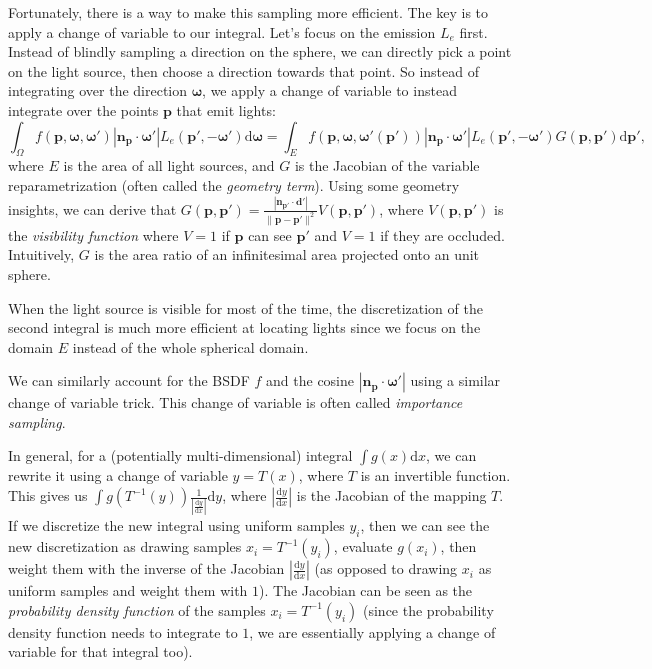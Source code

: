 \documentclass{article}
\begin{document}
Fortunately, there is a way to make this sampling more efficient. The key is to apply a change of variable to our integral. Let's focus on the emission $L_e$ first. Instead of blindly sampling a direction on the sphere, we can directly pick a point on the light source, then choose a direction towards that point. So instead of integrating over the direction $\mathbf{\omega}$, we apply a change of variable to instead integrate over the points $\mathbf{p}$ that emit lights:
\begin{equation}
    \int_{\Omega} f(\mathbf{p}, \mathbf{\omega}, \mathbf{\omega}') |\mathbf{n}_{\mathbf{p}} \cdot \mathbf{\omega}'| L_e(\mathbf{p}', -\mathbf{\omega}') \mathrm{d} \mathbf{\omega} =
    \int_{E} f(\mathbf{p}, \mathbf{\omega}, \mathbf{\omega}'(\mathbf{p}')) |\mathbf{n}_{\mathbf{p}} \cdot \mathbf{\omega}'| L_e(\mathbf{p}', -\mathbf{\omega}') G(\mathbf{p}, \mathbf{p}') \mathrm{d} \mathbf{p}',
\end{equation}
where $E$ is the area of all light sources, and $G$ is the Jacobian of the variable reparametrization (often called the \emph{geometry term}). Using some geometry insights, we can derive that $G(\mathbf{p}, \mathbf{p}') = \frac{|\mathbf{n}_{\mathbf{p}'} \cdot \mathbf{d}'|}{\|\mathbf{p} - \mathbf{p}'\|^2} V(\mathbf{p}, \mathbf{p}')$, where $V(\mathbf{p}, \mathbf{p}')$ is the \emph{visibility function} where $V=1$ if $\mathbf{p}$ can see $\mathbf{p}'$ and $V=1$ if they are occluded. Intuitively, $G$ is the area ratio of an infinitesimal area projected onto an unit sphere.

When the light source is visible for most of the time, the discretization of the second integral is much more efficient at locating lights since we focus on the domain $E$ instead of the whole spherical domain.

We can similarly account for the BSDF $f$ and the cosine $|\mathbf{n}_{\mathbf{p}} \cdot \mathbf{\omega}'|$ using a similar change of variable trick. This change of variable is often called \emph{importance sampling}.

In general, for a (potentially multi-dimensional) integral $\int g(x) \mathrm{d}x$, we can rewrite it using a change of variable $y = T(x)$, where $T$ is an invertible function. This gives us $\int g(T^{-1}(y)) \frac{1}{|\frac{\mathrm{d}y}{\mathrm{d}x}|} \mathrm{d}y$, where $|\frac{\mathrm{d}y}{\mathrm{d}x}|$ is the Jacobian of the mapping $T$. If we discretize the new integral using uniform samples $y_i$, then we can see the new discretization as drawing samples $x_i = T^{-1}(y_i)$, evaluate $g(x_i)$, then weight them with the inverse of the Jacobian $|\frac{\mathrm{d}y}{\mathrm{d}x}|$ (as opposed to drawing $x_i$ as uniform samples and weight them with $1$). The Jacobian can be seen as the \emph{probability density function} of the samples $x_i = T^{-1}(y_i)$ (since the probability density function needs to integrate to $1$, we are essentially applying a change of variable for that integral too). 
\end{document}
